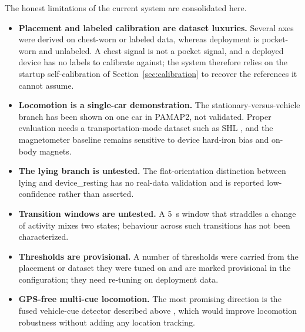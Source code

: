 \documentclass[11pt]{article}
\begin{document}
The honest limitations of the current system are consolidated here.

\begin{itemize}
  \item \textbf{Placement and labeled calibration are dataset luxuries.} Several axes
        were derived on chest-worn or labeled data, whereas deployment is pocket-worn
        and unlabeled. A chest signal is not a pocket signal, and a deployed device has
        no labels to calibrate against; the system therefore relies on the startup
        self-calibration of Section~\ref{sec:calibration} to recover the references it
        cannot assume.
  \item \textbf{Locomotion is a single-car demonstration.} The stationary-versus-vehicle
        branch has been shown on one car in PAMAP2, not validated. Proper evaluation
        needs a transportation-mode dataset such as SHL \citep{gjoreski2018shl}, and the
        magnetometer baseline remains sensitive to device hard-iron bias and on-body
        magnets.
  \item \textbf{The lying branch is untested.} The flat-orientation distinction between
        lying and device\_resting has no real-data validation and is reported
        low-confidence rather than asserted.
  \item \textbf{Transition windows are untested.} A 5~s window that straddles a change
        of activity mixes two states; behaviour across such transitions has not been
        characterized.
  \item \textbf{Thresholds are provisional.} A number of thresholds were carried from
        the placement or dataset they were tuned on and are marked provisional in the
        configuration; they need re-tuning on deployment data.
  \item \textbf{GPS-free multi-cue locomotion.} The most promising direction is the
        fused vehicle-cue detector described above
        \citep{hemminki2013transportation}, which would improve locomotion robustness
        without adding any location tracking.
\end{itemize}



\end{document}
